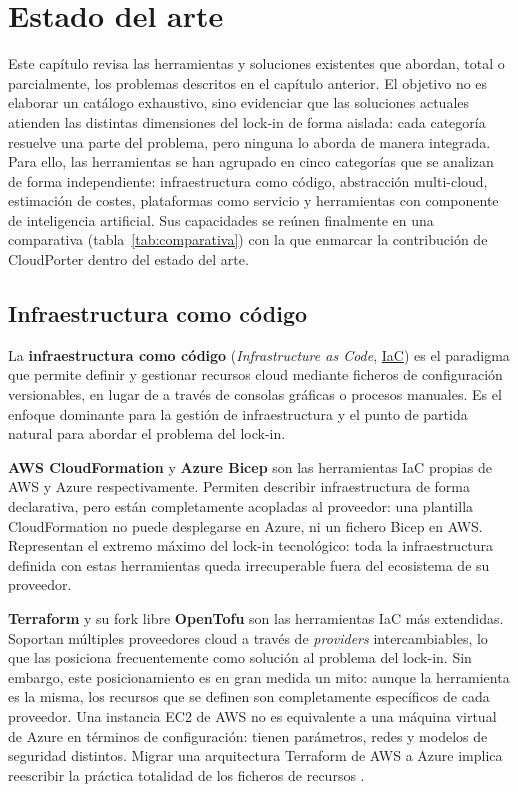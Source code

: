 \chapter{Estado del arte}\label{cap:estado}

Este capítulo revisa las herramientas y soluciones existentes que abordan, total o
parcialmente, los problemas descritos en el capítulo anterior. El objetivo no es
elaborar un catálogo exhaustivo, sino evidenciar que las soluciones actuales atienden
las distintas dimensiones del lock-in de forma aislada: cada categoría resuelve una
parte del problema, pero ninguna lo aborda de manera integrada. Para ello, las
herramientas se han agrupado en cinco categorías que se analizan de forma independiente:
infraestructura como código, abstracción multi-cloud, estimación de costes, plataformas
como servicio y herramientas con componente de inteligencia artificial. Sus capacidades
se reúnen finalmente en una comparativa (tabla~\ref{tab:comparativa}) con la que enmarcar
la contribución de CloudPorter dentro del estado del arte.

\section{Infraestructura como código}

La \textbf{infraestructura como código} (\textit{Infrastructure as Code}, \hyperlink{iac}{IaC}) es
el paradigma que permite definir y gestionar recursos cloud mediante ficheros de
configuración versionables, en lugar de a través de consolas gráficas o procesos
manuales. Es el enfoque dominante para la gestión de infraestructura y el punto de
partida natural para abordar el problema del lock-in.

\textbf{AWS CloudFormation} \cite{awsCloudFormation} y \textbf{Azure Bicep}
\cite{azureBicep} son las herramientas IaC propias de AWS y Azure respectivamente.
Permiten describir infraestructura de forma declarativa, pero están completamente
acopladas al proveedor: una plantilla CloudFormation no puede desplegarse en Azure,
ni un fichero Bicep en AWS. Representan el extremo máximo del lock-in tecnológico:
toda la infraestructura definida con estas herramientas queda irrecuperable
fuera del ecosistema de su proveedor.

\textbf{Terraform} \cite{terraformDocs} y su fork libre \textbf{OpenTofu}
\cite{opentofuDocs} son las herramientas IaC más extendidas. Soportan múltiples
proveedores cloud a través de \textit{providers} intercambiables, lo que las
posiciona frecuentemente como solución al problema del lock-in. Sin embargo, este
posicionamiento es en gran medida un mito: aunque la herramienta es la misma,
los recursos que se definen son completamente específicos de cada proveedor. Una
instancia EC2 de AWS no es equivalente a una máquina virtual de Azure en términos
de configuración: tienen parámetros, redes y modelos de seguridad distintos.
Migrar una arquitectura Terraform de AWS a Azure implica reescribir la práctica
totalidad de los ficheros de recursos \cite{cloudAgnosticMythRepo}.

